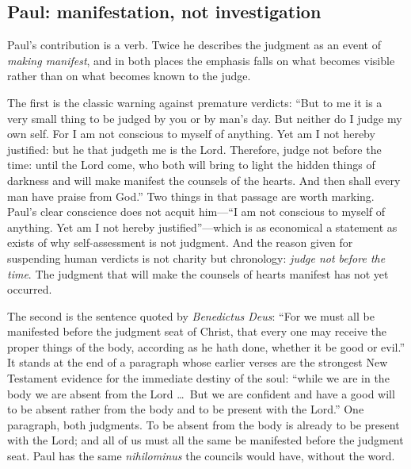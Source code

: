 \subsection{Paul: manifestation, not investigation}

Paul's contribution is a verb. Twice he describes the judgment as an event of \emph{making manifest}, and in both places the emphasis falls on what becomes visible rather than on what becomes known to the judge.

The first is the classic warning against premature verdicts: ``But to me it is a very small thing to be judged by you or by man's day. But neither do I judge my own self. For I am not conscious to myself of anything. Yet am I not hereby justified: but he that judgeth me is the Lord. Therefore, judge not before the time: until the Lord come, who both will bring to light the hidden things of darkness and will make manifest the counsels of the hearts. And then shall every man have praise from God.'' Two things in that passage are worth marking. Paul's clear conscience does not acquit him---``I am not conscious to myself of anything. Yet am I not hereby justified''---which is as economical a statement as exists of why self-assessment is not judgment. And the reason given for suspending human verdicts is not charity but chronology: \emph{judge not before the time}. The judgment that will make the counsels of hearts manifest has not yet occurred.

The second is the sentence quoted by \emph{Benedictus Deus}: ``For we must all be manifested before the judgment seat of Christ, that every one may receive the proper things of the body, according as he hath done, whether it be good or evil.'' It stands at the end of a paragraph whose earlier verses are the strongest New Testament evidence for the immediate destiny of the soul: ``while we are in the body we are absent from the Lord \ldots\ But we are confident and have a good will to be absent rather from the body and to be present with the Lord.'' One paragraph, both judgments. To be absent from the body is already to be present with the Lord; and all of us must all the same be manifested before the judgment seat. Paul has the same \emph{nihilominus} the councils would have, without the word.

